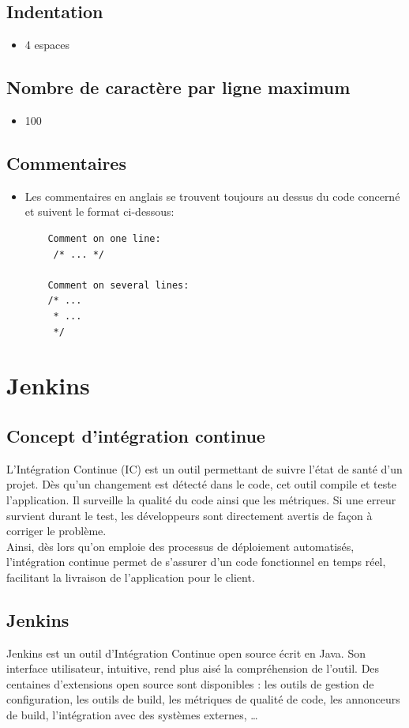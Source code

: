\documentclass[10pt,a4paper]{article}
\begin{document}
\subsection{Indentation}
\begin{itemize}
\item 4 espaces
\end{itemize}   

\subsection{Nombre de caractère par ligne maximum}  
\begin{itemize}
\item 100
\end{itemize}  

\subsection{Commentaires}
\begin{itemize}
\item Les commentaires en anglais se trouvent toujours au dessus du code concerné et suivent le format ci-dessous:
	\begin{lstlisting}
	Comment on one line:
	 /*	...	*/
	 
	Comment on several lines:
	/* ...
	 * ...
	 */
	\end{lstlisting}
\end{itemize}

\newpage
\section{Jenkins}
\subsection{Concept d'intégration continue}
L'Intégration Continue (IC) est un outil permettant de suivre l'état de santé d’un projet. Dès qu’un changement est détecté dans le code, cet outil compile et teste l’application. Il surveille la qualité du code ainsi que les métriques. Si une erreur survient durant le test, les développeurs sont directement avertis de façon à corriger le problème. \\
Ainsi, dès lors qu’on emploie des processus de déploiement automatisés, l’intégration continue permet de s’assurer d’un code fonctionnel en temps réel, facilitant la livraison de l’application pour le client. 

\subsection{Jenkins}
Jenkins est un outil d'Intégration Continue open source écrit en Java. Son interface utilisateur, intuitive, rend plus aisé la compréhension de l’outil.
Des centaines d'extensions open source sont disponibles : les outils de gestion de configuration, les outils de build, les métriques de qualité de code, les annonceurs de build, l'intégration avec des systèmes externes, … 
\end{document}
